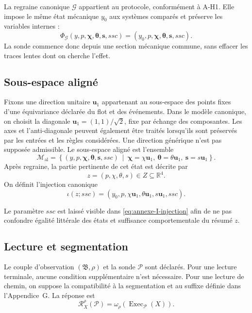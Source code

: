 La regraine canonique $\mathcal G$ appartient au protocole, conformément
à A-H1. Elle impose le même état mécanique $y_0$ aux systèmes comparés
et préserve les variables internes :
\[
\Phi_{\mathcal G}
(y,p,\boldsymbol\chi,\boldsymbol\theta,\mathbf s,ssc)
=
(y_0,p,\boldsymbol\chi,\boldsymbol\theta,\mathbf s,ssc).
\]
La sonde commence donc depuis une section mécanique commune, sans effacer
les traces lentes dont on cherche l'effet.

\subsection{Sous-espace aligné}
\label{annexe-I-sous-espace-aligne}

Fixons une direction unitaire $\mathbf u_1$ appartenant au sous-espace des
points fixes d'une équivariance déclarée du flot et des événements. Dans
le modèle canonique, on choisit la diagonale
$\mathbf u_1=(1,1)/\sqrt2$, fixe par échange des composantes. Les axes
et l'anti-diagonale peuvent également être traités lorsqu'ils sont
préservés par les entrées et les règles considérées. Une direction
générique n'est pas supposée admissible. Le sous-espace aligné est
l'ensemble
\[
\mathcal M_{\mathrm{al}}
=
\left\{
(y,p,\boldsymbol\chi,\boldsymbol\theta,\mathbf s,ssc)
\ \middle|\
\boldsymbol\chi=\chi\mathbf u_1,
\ \boldsymbol\theta=\theta\mathbf u_1,
\ \mathbf s=s\mathbf u_1
\right\}.
\]
Après regraine, la partie pertinente de cet état est décrite par
\[
z=(p,\chi,\theta,s)\in Z\subseteq\mathbb R^4.
\]
On définit l'injection canonique
\begin{equation}
\label{eq:annexe-I-injection}
\iota(z;ssc)
=
(y_0,p,\chi\mathbf u_1,\theta\mathbf u_1,s\mathbf u_1,ssc).
\end{equation}

Le paramètre $ssc$ est laissé visible dans
\eqref{eq:annexe-I-injection} afin de ne pas confondre égalité littérale
des états et suffisance comportementale du résumé $z$.

\subsection{Lecture et segmentation}
\label{annexe-I-lecture}

Le couple d'observation $(\mathfrak B,\rho)$ et la sonde $\mathcal P$
sont déclarés. Pour une lecture terminale, aucune condition
supplémentaire n'est nécessaire. Pour une lecture de chemin, on suppose
la compatibilité à la segmentation et au suffixe définie dans
l'Appendice~G. La réponse est
\[
\mathcal R_X^\rho(\mathcal P)
=
\omega_\rho\!\left(
\operatorname{Exec}_{\mathcal P}(X)
\right).
\]

